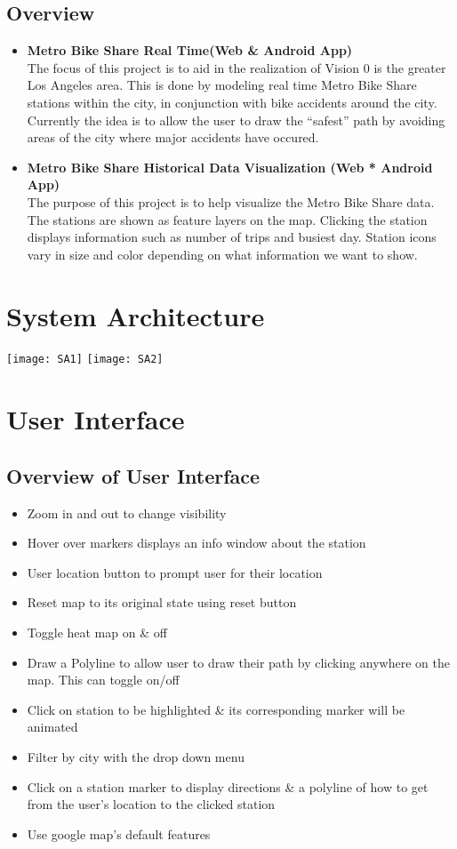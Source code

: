 \documentclass{article}
\begin{document}
\subsection{Overview}
\begin{itemize}
	\item \textbf{Metro Bike Share Real Time(Web \& Android App)}\\
The focus of this project is to aid in the realization of Vision 0 is the greater Los Angeles area. This is done by modeling real time Metro Bike Share stations within the city, in conjunction with bike accidents around the city. Currently the idea is to allow the user to draw the “safest” path by avoiding areas of the city where major accidents have occured.

	\item \textbf{Metro Bike Share Historical Data Visualization (Web * Android App) }\\
The purpose of this project is to help visualize the Metro Bike Share data. The stations are shown as feature layers on the map. Clicking the station displays information such as number of trips and busiest day. Station icons vary in size and color depending on what information we want to show.
\end{itemize}

\section{System Architecture}
\texttt{[image: SA1]}
\texttt{[image: SA2]}

\newpage

\section{User Interface}
\subsection{Overview of User Interface}
\begin{itemize}
	\item Zoom in and out to change visibility
	\item Hover over markers displays an info window about the station
	\item User location button to prompt user for their location
	\item Reset map to its original state using reset button
	\item Toggle heat map on \& off
	\item Draw a Polyline to allow user to draw their path by clicking anywhere on the map. This can toggle on/off
	\item Click on station to be highlighted \& its corresponding marker will be animated
	\item Filter by city with the drop down menu
	\item Click on a station marker to display directions \& a polyline of how to get from the user’s location to the clicked station
	\item Use google map’s default features
\end{itemize}
\end{document}
